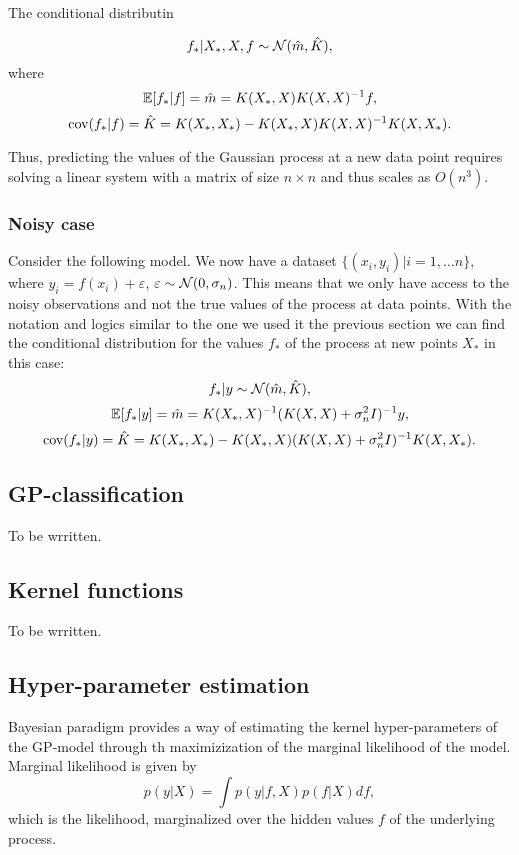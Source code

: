 \documentclass[12pt]{article}
\begin{document}
	The conditional distributin
	
	$$f_* | X_*, X, f \sim \mathcal{N}( \hat m, \hat K ),$$
	where 
	$$\mathbb{E} [f_* | f ] = \hat m = K(X_*, X) K(X, X)^{-1} f,$$
	$$\mbox{cov}(f_* | f ) = \hat K = K(X_*, X_*) - K(X_*, X)K(X, X)^{-1}K(X, X_*).$$
		
	Thus, predicting the values of the Gaussian process at a new data point requires solving a linear system with a matrix of size $n \times n$ and thus scales as $O(n^3)$.
	
	\subsubsection{Noisy case}
		\hspace{0.6cm}Consider the following model. We now have a dataset $\{(x_i, y_i)| i = 1, \ldots n\}$, where $y_i = f(x_i) + \varepsilon$, $\varepsilon \sim \mathcal{N}(0, \sigma_n)$. This means that we only have access to the noisy observations and not the true values of the process at data points. With the notation and logics similar to the one we used it the previous section we can find the conditional distribution for the values $f_*$ of the process at new points $X_*$ in this case:
		$$f_* | y \sim \mathcal{N}( \hat m, \hat K ),$$
		$$\mathbb{E}[f_* | y] = \hat m = K(X_*, X)^{-1} (K(X, X) + \sigma_n^2 I)^{-1} y,$$
		$$\mbox{cov}(f_* | y ) = \hat K = K(X_*, X_*) - K(X_*, X)(K(X, X) + \sigma_n^2 I)^{-1}K(X, X_*).$$
		
\subsection{GP-classification}
	\hspace{0.6cm}To be wrritten.
	
\subsection{Kernel functions}
	\hspace{0.6cm}To be wrritten.
	
\subsection{Hyper-parameter estimation}
	\hspace{0.6cm}Bayesian paradigm provides a way of estimating the kernel hyper-parameters of the GP-model through th  maximizization of the marginal likelihood of the model. Marginal likelihood is given by
	$$p(y | X) = \int p(y | f, X) p(f | X) df,$$
	which is the likelihood, marginalized over the hidden values $f$ of the underlying process.
	
\end{document}

